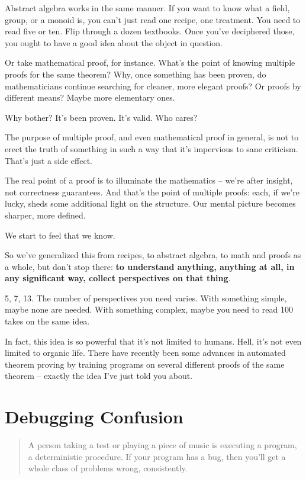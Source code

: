 Abstract algebra works in the same manner. If you want to know what a field,
group, or a monoid is, you can't just read one recipe, one treatment. You need
to read five or ten. Flip through a dozen textbooks. Once you've deciphered those, you ought to have a good
idea about the object in question.

Or take mathematical proof, for instance. What's the point of knowing multiple
proofs for the same theorem? Why, once something has been proven, do
mathematicians continue searching for cleaner, more elegant proofs? Or proofs by
different means? Maybe more elementary ones.

Why bother? It's been proven. It's valid. Who cares?

The purpose of multiple proof, and even mathematical proof in general, is not to
erect the truth of something in such a way that it's impervious to sane
criticism. That's just a side effect.

The real point of a proof is to illuminate the mathematics -- we're after
insight, not correctness guarantees. And that's the point of multiple proofs:
each, if we're lucky, sheds some additional light on the structure. Our mental
picture becomes sharper, more defined.

We start to feel that we know.

So we've generalized this from recipes, to abstract algebra, to math and proofs
as a whole, but don't stop there: \textbf{to understand anything, anything at all, in
  any significant way, collect perspectives on that thing}.

5, 7, 13. The number of perspectives you need varies. With something simple,
maybe none are needed. With something complex, maybe you need to read 100 takes
on the same idea.

In fact, this idea is so powerful that it's not limited to humans. Hell, it's
not even limited to organic life. There have recently been some advances in
automated theorem proving by training programs on several different proofs of
the same theorem -- exactly the idea I've just told you about.


\section{Debugging Confusion}
\begin{quote}
A person taking a test or playing a piece of music is executing a program, a
deterministic procedure.  If your program has a bug, then you'll get a whole
class of problems wrong, consistently.
\end{quote}

